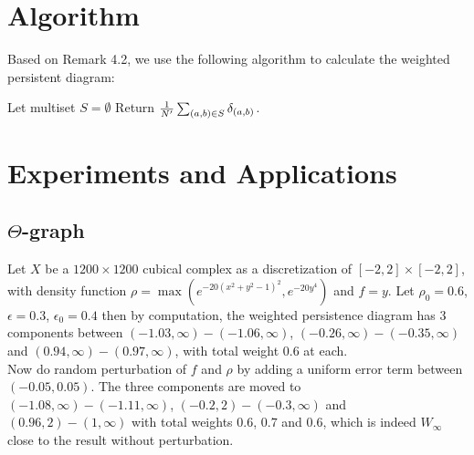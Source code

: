 \documentclass[11pt]{article}
\theoremstyle{plain}
\theoremstyle{definition}
\theoremstyle{definition}
\theoremstyle{definition}
\theoremstyle{definition}
\theoremstyle{definition}
\theoremstyle{definition}
\theoremstyle{definition}
\theoremstyle{definition}
\begin{document}
\section{Algorithm}

Based on Remark 4.2, we use the following algorithm to calculate the weighted persistent diagram:


\begin{algorithm}[H]
\SetAlgoLined
Let multiset $S=\emptyset$\;
Return ${1\over N'}\sum_{(a,b)\in S}\delta_{(a,b)}$.
\caption{}
\end{algorithm}


\section{Experiments and Applications}

\subsection{$\Theta$-graph}

Let $X$ be a $1200\times 1200$ cubical complex as a discretization of $[-2,2]\times[-2,2]$, with density function $\rho=\max(e^{-20(x^2+y^2-1)^2}, e^{-20y^4})$ and $f=y$. Let $\rho_0=0.6$, $\epsilon=0.3$, $\epsilon_0=0.4$ then by computation, the weighted persistence diagram has 3 components between $(-1.03,\infty)-(-1.06,\infty)$, $(-0.26,\infty)-(-0.35,\infty)$ and $(0.94,\infty)-(0.97,\infty)$, with total weight $0.6$ at each.\\

Now do random perturbation of $f$ and $\rho$ by adding a uniform error term between $(-0.05,0.05)$. The three components are moved to $(-1.08,\infty)-(-1.11,\infty)$, $(-0.2,2)-(-0.3,\infty)$ and $(0.96,2)-(1,\infty)$ with total weights $0.6$, $0.7$ and $0.6$, which is indeed $W_\infty$ close to the result without perturbation.\\
\end{document}
